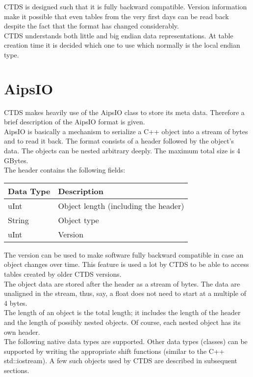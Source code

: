 CTDS is designed such that it is fully backward compatible. Version
information make it possible that even
tables from the very first days can be read back despite the fact that
the format has changed considerably.
\\CTDS understands both little and big endian data
representations. At table creation time it is decided which one to use
which normally is the local endian type.


\section{\label{CTDS:AIPSIO}AipsIO}
CTDS makes heavily use of the AipsIO class to store its meta
data. Therefore a brief description of the AipsIO format is given.
\\AipsIO is basically a mechanism to serialize a C++ object into a
stream of bytes and to read it back. The format consists of a header followed
by the object's data. The objects can be nested arbitrary deeply. The maximum
total size is 4 GBytes.
\\The header contains the following fields:

\vspace{0.15in}
\begin{tabular}{|l|l|} \hline
  Data Type & Description \\ \hline\hline
  uInt & Object length (including the header) \\
  String & Object type \\
  uInt & Version \\
  \hline
\end{tabular}
\vspace{0.15in}

The version can be used to make software fully backward compatible
in case an object changes over time. This feature is used a lot by
CTDS to be able to access tables created by older CTDS versions.
\\The object data are stored after the header as a stream of
bytes. The data are unaligned in the stream, thus, say, a float
does not need to start at a multiple of 4 bytes.
\\The length of an object is the total length; it includes the length
of the header and the length of possibly nested objects. Of course, each nested
object has its own header.
\\The following native data types are supported. Other data types
(classes) can be supported by writing the appropriate shift functions
(similar to the C++ std::iostream). A few such objects used by CTDS
are described in subsequent sections.

